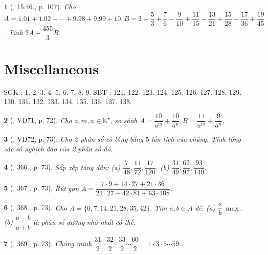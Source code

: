 \documentclass{article}
\newtheorem{baitoan}{}
\begin{document}
\begin{baitoan}[\cite{TLCT_THCS_Toan_6_so_hoc}, 15.46., p. 107]
	Cho $A = 1.01 + 1.02 + \cdots + 9.98 + 9.99 + 10,B = 2 - \dfrac{5}{3} + \dfrac{7}{6} - \dfrac{9}{10} + \dfrac{11}{15} - \dfrac{13}{21} + \dfrac{15}{28} - \dfrac{17}{36} + \dfrac{19}{45}$. Tính $2A + \dfrac{455}{3}B$.
\end{baitoan}


\section{Miscellaneous}
SGK \cite[BTCCCV, pp. 71--72]{SGK_Toan_6_Canh_Dieu_tap_2}: 1. 2. 3. 4. 5. 6. 7. 8. 9. SBT \cite[BTCCV, pp. 59--63]{SBT_Toan_6_Canh_Dieu_tap_2}: 121. 122. 123. 124. 125. 126. 127. 128. 129. 130. 131. 132. 133. 134. 135. 136. 137. 138.

\begin{baitoan}[\cite{Tuyen_Toan_6}, VD71, p. 72]
	Cho $a,m,n\in\mathbb{N}^\star$, so sánh $A = \dfrac{10}{a^m} + \dfrac{10}{a^n},B = \dfrac{11}{a^m} + \dfrac{9}{a^n}$.
\end{baitoan}

\begin{baitoan}[\cite{Tuyen_Toan_6}, VD72, p. 73]
	Cho 2 phân số có tổng bằng $5$ lần tích của chúng. Tính tổng các số nghịch đảo của 2 phân số đó.
\end{baitoan}

\begin{baitoan}[\cite{Tuyen_Toan_6}, 366., p. 73]
	Sắp xếp tăng dần: (a) $\dfrac{7}{48},\dfrac{11}{72},\dfrac{17}{120}$. (b) $\dfrac{31}{49},\dfrac{62}{97},\dfrac{93}{140}$.
\end{baitoan}

\begin{baitoan}[\cite{Tuyen_Toan_6}, 367., p. 73]
	Rút gọn $A = \dfrac{7\cdot9 + 14\cdot27 + 21\cdot36}{21\cdot27 + 42\cdot81 + 63\cdot108}$.
\end{baitoan}

\begin{baitoan}[\cite{Tuyen_Toan_6}, 368., p. 73]
	Cho $A = \{0,7,14,21,28,35,42\}$. Tìm $a,b\in A$ để: (a) $\dfrac{a}{b}\ \max$. (b) $\dfrac{a - b}{a + b}$ là phân số dương nhỏ nhất có thể.
\end{baitoan}

\begin{baitoan}[\cite{Tuyen_Toan_6}, 369., p. 73]
	Chứng minh $\dfrac{31}{2}\cdot\dfrac{32}{2}\cdot\dfrac{33}{2}\cdots\dfrac{60}{2} = 1\cdot3\cdot5\cdots59$.
\end{baitoan}
\end{document}
